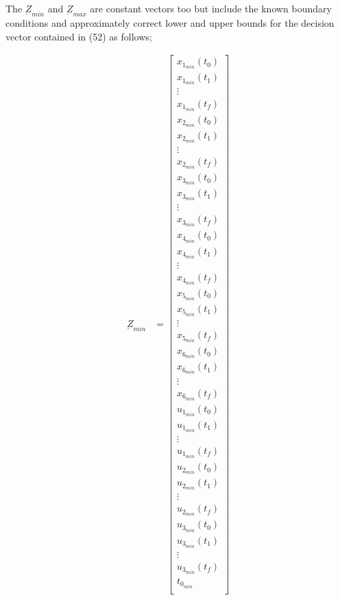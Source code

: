 \documentclass[11pt,usenames]{article}
\begin{document}
	The $ \underbar Z_{min}$ and $ \underbar Z_{max} $ are constant vectors too but include the known boundary conditions and approximately correct lower and upper bounds for the decision vector contained in (52) as follows;
	
	\begin{align}
	\underbar Z_{min} &= 
	\begin{bmatrix}
	x_{1_{min}}(t_{0}) \\ x_{1_{min}}(t_{1}) \\  \vdots \\  x_{1_{min}}(t_{f}) \\  
	x_{2_{min}}(t_{0}) \\ x_{2_{min}}(t_{1}) \\ \vdots \\  x_{2_{min}}(t_{f}) \\ 
	x_{3_{min}}(t_{0}) \\ x_{3_{min}}(t_{1}) \\ \vdots \\  x_{3_{min}}(t_{f}) \\ 
	x_{4_{min}}(t_{0}) \\ x_{4_{min}}(t_{1}) \\ \vdots \\  x_{4_{min}}(t_{f}) \\ 
	x_{5_{min}}(t_{0}) \\ x_{5_{min}}(t_{1}) \\ \vdots \\  x_{5_{min}}(t_{f}) \\
	x_{6_{min}}(t_{0}) \\ x_{6_{min}}(t_{1}) \\ \vdots \\  x_{6_{min}}(t_{f}) \\
	u_{1_{min}}(t_{0}) \\ u_{1_{min}}(t_{1}) \\ \vdots \\  u_{1_{min}}(t_{f}) \\ 
	u_{2_{min}}(t_{0}) \\ u_{2_{min}}(t_{1}) \\ \vdots \\  u_{2_{min}}(t_{f}) \\ 
	u_{3_{min}}(t_{0}) \\ u_{3_{min}}(t_{1}) \\ \vdots \\  u_{3_{min}}(t_{f}) \\ 
	t_{0_{min}} \\ 

\end{bmatrix}
\end{align}
\end{document}
